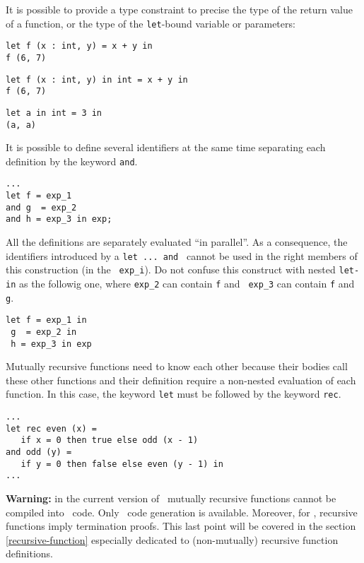 It is possible to provide a type constraint to precise the type of the
return value of a function, or the type of the {\tt let}-bound
variable or parameters:

{\scriptsize
\begin{lstlisting}
let f (x : int, y) = x + y in
f (6, 7)
\end{lstlisting}
}
{\scriptsize
\begin{lstlisting}
let f (x : int, y) in int = x + y in
f (6, 7)
\end{lstlisting}
}
{\scriptsize
\begin{lstlisting}
let a in int = 3 in
(a, a)
\end{lstlisting}
}



\medskip
It is possible to define several identifiers at the same time separating
each definition by the keyword {\tt and}.
{\scriptsize
\begin{lstlisting}
...
let f = exp_1
and g  = exp_2
and h = exp_3 in exp;
\end{lstlisting}
}

All the definitions are separately evaluated ``in parallel''.  As a
consequence, the identifiers introduced by a {\tt let ... and }
cannot be used in the right members of this construction (in the {\tt
  exp\_i}). Do not confuse this construct with nested {\tt let-in} as
the followig one, where {\tt exp\_2} can contain {\tt f} and {\tt
  exp\_3} can contain {\tt f} and {\tt g}.

{\scriptsize
\begin{lstlisting}
let f = exp_1 in
 g  = exp_2 in
 h = exp_3 in exp
\end{lstlisting}
}

Mutually recursive functions need to know each other because their
bodies call these other functions and their definition require a
non-nested evaluation of each function.  In this case, the keyword
{\tt let} must be followed by the keyword {\tt rec}.

{\scriptsize
\begin{lstlisting}
...
let rec even (x) =
   if x = 0 then true else odd (x - 1)
and odd (y) =
   if y = 0 then false else even (y - 1) in
...
\end{lstlisting}
}

{\large {\bf Warning:}} in the current version of \focal\ mutually
recursive functions cannot be compiled into \coq\ code. Only
\ocaml\ code generation is available. Moreover, for \coq, recursive
functions imply termination proofs. This last point will be covered in
the section \ref{recursive-function} especially dedicated to
(non-mutually) recursive function definitions.



